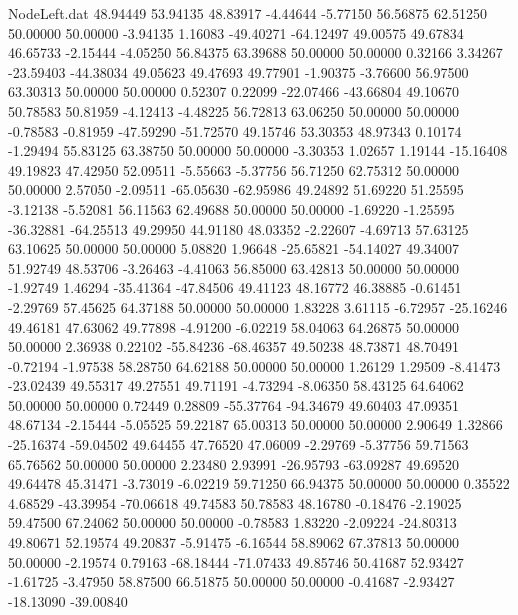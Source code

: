 \begin{filecontents}{NodeLeft.dat}
  48.94449   53.94135   48.83917    -4.44644   -5.77150   56.56875   62.51250   50.00000   50.00000   -3.94135    1.16083  -49.40271  -64.12497
  49.00575   49.67834   46.65733    -2.15444   -4.05250   56.84375   63.39688   50.00000   50.00000    0.32166    3.34267  -23.59403  -44.38034
  49.05623   49.47693   49.77901    -1.90375   -3.76600   56.97500   63.30313   50.00000   50.00000    0.52307    0.22099  -22.07466  -43.66804
  49.10670   50.78583   50.81959    -4.12413   -4.48225   56.72813   63.06250   50.00000   50.00000   -0.78583   -0.81959  -47.59290  -51.72570
  49.15746   53.30353   48.97343     0.10174   -1.29494   55.83125   63.38750   50.00000   50.00000   -3.30353    1.02657    1.19144  -15.16408
  49.19823   47.42950   52.09511    -5.55663   -5.37756   56.71250   62.75312   50.00000   50.00000    2.57050   -2.09511  -65.05630  -62.95986
  49.24892   51.69220   51.25595    -3.12138   -5.52081   56.11563   62.49688   50.00000   50.00000   -1.69220   -1.25595  -36.32881  -64.25513
  49.29950   44.91180   48.03352    -2.22607   -4.69713   57.63125   63.10625   50.00000   50.00000    5.08820    1.96648  -25.65821  -54.14027
  49.34007   51.92749   48.53706    -3.26463   -4.41063   56.85000   63.42813   50.00000   50.00000   -1.92749    1.46294  -35.41364  -47.84506
  49.41123   48.16772   46.38885    -0.61451   -2.29769   57.45625   64.37188   50.00000   50.00000    1.83228    3.61115   -6.72957  -25.16246
  49.46181   47.63062   49.77898    -4.91200   -6.02219   58.04063   64.26875   50.00000   50.00000    2.36938    0.22102  -55.84236  -68.46357
  49.50238   48.73871   48.70491    -0.72194   -1.97538   58.28750   64.62188   50.00000   50.00000    1.26129    1.29509   -8.41473  -23.02439
  49.55317   49.27551   49.71191    -4.73294   -8.06350   58.43125   64.64062   50.00000   50.00000    0.72449    0.28809  -55.37764  -94.34679
  49.60403   47.09351   48.67134    -2.15444   -5.05525   59.22187   65.00313   50.00000   50.00000    2.90649    1.32866  -25.16374  -59.04502
  49.64455   47.76520   47.06009    -2.29769   -5.37756   59.71563   65.76562   50.00000   50.00000    2.23480    2.93991  -26.95793  -63.09287
  49.69520   49.64478   45.31471    -3.73019   -6.02219   59.71250   66.94375   50.00000   50.00000    0.35522    4.68529  -43.39954  -70.06618
  49.74583   50.78583   48.16780    -0.18476   -2.19025   59.47500   67.24062   50.00000   50.00000   -0.78583    1.83220   -2.09224  -24.80313
  49.80671   52.19574   49.20837    -5.91475   -6.16544   58.89062   67.37813   50.00000   50.00000   -2.19574    0.79163  -68.18444  -71.07433
  49.85746   50.41687   52.93427    -1.61725   -3.47950   58.87500   66.51875   50.00000   50.00000   -0.41687   -2.93427  -18.13090  -39.00840

\end{filecontents}
